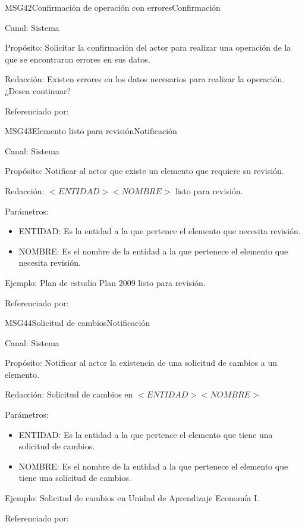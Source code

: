 \begin{mensaje}{MSG42}{Confirmación de operación con errores}{Confirmación}
	\item[Canal:] Sistema
	\item[Propósito:] Solicitar la confirmación del actor para realizar una operación de la que se encontraron errores en sus datos.
	\item[Redacción:] Existen errores en los datos necesarios para realizar la operación. ¿Desea continuar?
	\item[Referenciado por:] %
\end{mensaje}

\begin{mensaje}{MSG43}{Elemento listo para revisión}{Notificación}
	\item[Canal:] Sistema
	\item[Propósito:] Notificar al actor que existe un elemento  que requiere su revisión.
	\item[Redacción:] $<ENTIDAD> <NOMBRE>$ listo para revisión. 
	\item[Parámetros:] 
	\begin{itemize}
		\item ENTIDAD: Es la entidad a la que pertence el elemento que necesita revisión.
		\item NOMBRE: Es el nombre de la entidad a la que pertenece el elemento que necesita revisión.
	\end{itemize}
	\item[Ejemplo:] Plan de estudio Plan 2009 listo para revisión.
	\item[Referenciado por:] 
\end{mensaje}

\begin{mensaje}{MSG44}{Solicitud de cambios}{Notificación}
	\item[Canal:] Sistema
	\item[Propósito:] Notificar al actor la existencia de una solicitud de cambios a un elemento.
	\item[Redacción:] Solicitud de cambios en $<ENTIDAD> <NOMBRE>$
	\item[Parámetros:] 
	\begin{itemize}
		\item ENTIDAD: Es la entidad a la que pertence el elemento que tiene una solicitud de cambios.
		\item NOMBRE: Es el nombre de la entidad a la que pertenece el elemento que tiene una solicitud de cambios.
	\end{itemize}
	\item[Ejemplo:] Solicitud de cambios en Unidad de Aprendizaje Economía I.
	\item[Referenciado por:] 
\end{mensaje}

